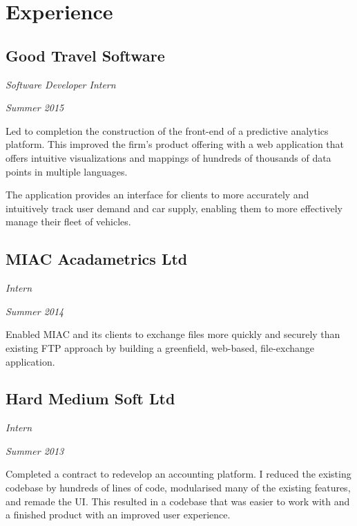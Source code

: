 \section*{Experience}

\subsection*{Good Travel Software}
\noindent\begin{minipage}[b]{0.5\textwidth}
  \flushleft
  \emph{Software Developer Intern}
\end{minipage}
\noindent\begin{minipage}[b]{0.5\textwidth}
  \flushright
  \emph{Summer 2015}
\end{minipage}

Led to completion the construction of the front-end of a predictive analytics platform. This improved the firm's product offering with a web application that offers intuitive visualizations and mappings of hundreds of thousands of data points in multiple languages.

The application provides an interface for clients to more accurately and intuitively track user demand and car supply, enabling them to more effectively manage their fleet of vehicles.

\subsection*{MIAC Acadametrics Ltd}
\noindent\begin{minipage}[b]{0.5\textwidth}
  \flushleft
  \emph{Intern}
\end{minipage}
\noindent\begin{minipage}[b]{0.5\textwidth}
  \flushright
  \emph{Summer 2014}
\end{minipage}

Enabled MIAC and its clients to exchange files more quickly and securely than existing FTP approach by building a greenfield, web-based, file-exchange application.

\subsection*{Hard Medium Soft Ltd}
\noindent\begin{minipage}[b]{0.5\textwidth}
  \flushleft
  \emph{Intern}
\end{minipage}
\noindent\begin{minipage}[b]{0.5\textwidth}
  \flushright
  \emph{Summer 2013}
\end{minipage}

Completed a contract to redevelop an accounting platform. I reduced the existing codebase by hundreds of lines of code, modularised many of the existing features, and remade the UI. This resulted in a codebase that was easier to work with and a finished product with an improved user experience.

